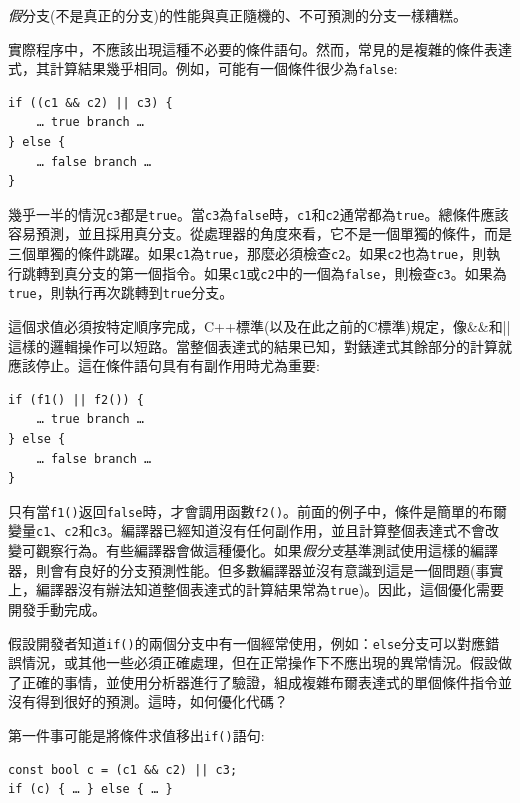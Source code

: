 \textit{假}分支(不是真正的分支)的性能與真正隨機的、不可預測的分支一樣糟糕。

實際程序中，不應該出現這種不必要的條件語句。然而，常見的是複雜的條件表達式，其計算結果幾乎相同。例如，可能有一個條件很少為\texttt{false}:

\begin{lstlisting}[style=styleCXX]
if ((c1 && c2) || c3) {
	… true branch …
} else {
	… false branch …
}
\end{lstlisting}

幾乎一半的情況\texttt{c3}都是\texttt{true}。當\texttt{c3}為\texttt{false}時，\texttt{c1}和\texttt{c2}通常都為\texttt{true}。總條件應該容易預測，並且採用真分支。從處理器的角度來看，它不是一個單獨的條件，而是三個單獨的條件跳躍。如果\texttt{c1}為\texttt{true}，那麼必須檢查\texttt{c2}。如果\texttt{c2}也為\texttt{true}，則執行跳轉到真分支的第一個指令。如果\texttt{c1}或\texttt{c2}中的一個為\texttt{false}，則檢查\texttt{c3}。如果為\texttt{true}，則執行再次跳轉到\texttt{true}分支。

這個求值必須按特定順序完成，C++標準(以及在此之前的C標準)規定，像\&\&和||這樣的邏輯操作可以短路。當整個表達式的結果已知，對錶達式其餘部分的計算就應該停止。這在條件語句具有有副作用時尤為重要:

\begin{lstlisting}[style=styleCXX]
if (f1() || f2()) {
	… true branch …
} else {
	… false branch …
}
\end{lstlisting}

只有當\texttt{f1()}返回\texttt{false}時，才會調用函數\texttt{f2()}。前面的例子中，條件是簡單的布爾變量\texttt{c1}、\texttt{c2}和\texttt{c3}。編譯器已經知道沒有任何副作用，並且計算整個表達式不會改變可觀察行為。有些編譯器會做這種優化。如果\textit{假分支}基準測試使用這樣的編譯器，則會有良好的分支預測性能。但多數編譯器並沒有意識到這是一個問題(事實上，編譯器沒有辦法知道整個表達式的計算結果常為\texttt{true})。因此，這個優化需要開發手動完成。

假設開發者知道\texttt{if()}的兩個分支中有一個經常使用，例如：\texttt{else}分支可以對應錯誤情況，或其他一些必須正確處理，但在正常操作下不應出現的異常情況。假設做了正確的事情，並使用分析器進行了驗證，組成複雜布爾表達式的單個條件指令並沒有得到很好的預測。這時，如何優化代碼？

第一件事可能是將條件求值移出\texttt{if()}語句:

\begin{lstlisting}[style=styleCXX]
const bool c = (c1 && c2) || c3;
if (c) { … } else { … }
\end{lstlisting}

